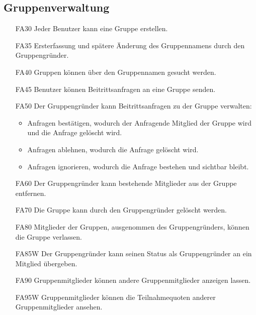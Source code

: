 \documentclass{scrartcl}
\begin{document}
	\subsection{Gruppenverwaltung}
	\begin{itemize}
		\item[FA30] Jeder Benutzer kann eine Gruppe erstellen.
		\item[FA35] Ersterfassung und spätere Änderung des Gruppennamens durch den Gruppengründer.
		\item[FA40] Gruppen können über den Gruppennamen gesucht werden.
		\item[FA45] Benutzer können Beitrittsanfragen an eine Gruppe senden.
		\item[FA50] Der Gruppengründer kann Beitrittsanfragen zu der Gruppe verwalten:
		\begin{itemize}
			\item Anfragen bestätigen, wodurch der Anfragende Mitglied der Gruppe wird und die Anfrage gelöscht wird.
		\end{itemize}
		\begin{itemize}
			\item Anfragen ablehnen, wodurch die Anfrage gelöscht wird.
		\end{itemize}
		\begin{itemize}
			\item Anfragen ignorieren, wodurch die Anfrage bestehen und sichtbar bleibt.
		\end{itemize}
		\item[FA60] Der Gruppengründer kann bestehende Mitglieder aus der Gruppe entfernen.
		\item[FA70] Die Gruppe kann durch den Gruppengründer gelöscht werden.
		\item[FA80] Mitglieder der Gruppen, ausgenommen des Gruppengründers, können die Gruppe verlassen.
		\item[FA85W] Der Gruppengründer kann seinen Status als Gruppengründer an ein Mitglied übergeben.
		\item[FA90] Gruppenmitglieder können andere Gruppenmitglieder anzeigen lassen.
		\item[FA95W] Gruppenmitglieder können die Teilnahmequoten anderer Gruppenmitglieder ansehen.
		
	\end{itemize}
	
\end{document}
